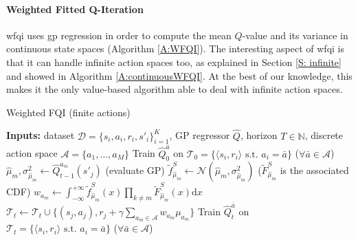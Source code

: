 \paragraph{Weighted Fitted Q-Iteration} \gls{wfqi} uses \gls{gp} regression in order to compute the mean $Q$-value and its variance in continuous state spaces (Algorithm \ref{A:WFQI}). The interesting aspect of \gls{wfqi} is that it can handle infinite action spaces too, as explained in Section \ref{S: infinite} and showed in Algorithm \ref{A:continuousWFQI}. At the best of our knowledge, this makes it the only value-based algorithm able to deal with infinite action spaces.

\begin{algorithm}[t]
\caption{Weighted FQI (finite actions)}
\label{A:WFQI}
\begin{small}
\begin{algorithmic} 
\STATE \textbf{Inputs:} dataset $\mathcal{D}=\{s_i,a_i,r_i,s'_i\}_{i=1}^{K}$, GP regressor $\widehat{Q}$, horizon $T \in \mathbb{N}$, discrete action space $\mathcal{A} = \{a_1,\ldots, a_M\}$
\STATE Train $\widehat{Q}_0^{\bar a}$ on $\mathcal{T}_0 = \{\langle s_i, r_i\rangle  \text{ s.t. } a_i = \bar{a} \}$ ($\forall \bar{a} \in \mathcal{A}$)
\STATE $\hat{\mu}_{m}, \sigma^2_{\hat{\mu}_{m}} \leftarrow \widehat{Q}_{t-1}^{a_m}(s'_j)$ (evaluate GP)
\STATE $\tilde{f}_{\hat{\mu}_{m}}^S \leftarrow \mathcal{N}(\hat{\mu}_{m}, \sigma^2_{\hat{\mu}_m})$ ($\tilde{F}_{\hat{\mu}_{m}}^S$ is the associated CDF) 
\STATE $w_{a_m} \leftarrow \int_{-\infty}^{+\infty} \tilde{f}_{\hat{\mu}_{m}}^S(x) \prod_{k\neq m} \tilde{F}^S_{\hat{\mu}_{m}}(x) \mathrm{d}x$
\ENDFOR
\STATE $\mathcal{T}_t \leftarrow \mathcal{T}_t \cup \{(s_j,a_j), r_j + \gamma \sum_{a_m \in \mathcal{A}} w_{a_m} \mu_{a_m}\}$
\ENDFOR
\STATE Train $\widehat{Q}_t^{\bar a}$ on $\mathcal{T}_t = \{\langle s_i, r_i\rangle  \text{ s.t. } a_i = \bar{a} \}$ ($\forall \bar{a} \in \mathcal{A}$)
\ENDFOR
\end{algorithmic}
\end{small}
\end{algorithm}

